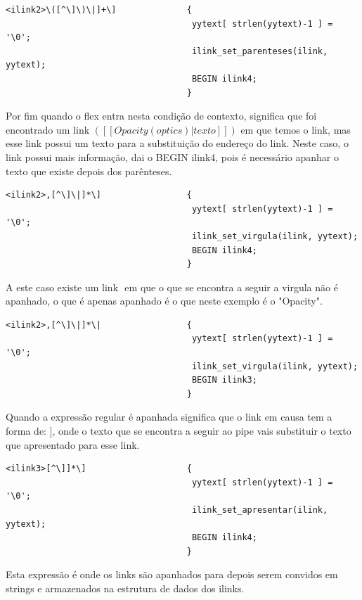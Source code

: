 \documentclass[11pt, a4paper, oneside]{article}
\begin{document}
\begin{verbatim}
<ilink2>\([^\]\)\|]+\]              {
                                     yytext[ strlen(yytext)-1 ] = '\0';
                                     ilink_set_parenteses(ilink, yytext);
                                     BEGIN ilink4;
                                    }
\end{verbatim}
Por fim quando o flex entra nesta condição de contexto, significa que foi encontrado um link \begin{math}([[Opacity (optics)|texto]])\end{math} em que temos o link, mas esse link possui um texto para a substituição do endereço do link.
Neste caso, o link possui mais informação, dai o BEGIN ilink4, pois é necessário apanhar o texto que existe depois dos parênteses.

\begin{verbatim}
<ilink2>,[^\]\|]*\]                 {
                                     yytext[ strlen(yytext)-1 ] = '\0';
                                     ilink_set_virgula(ilink, yytext);
                                     BEGIN ilink4;
                                    }
\end{verbatim}
A este caso existe um link \begin{math}[[Opacity, Não via ser apanhar]\end{math} em que o que se encontra a seguir a virgula não é apanhado, o que é apenas apanhado é o que neste exemplo é o "Opacity".

\begin{verbatim}
<ilink2>,[^\]\|]*\|                 {
                                     yytext[ strlen(yytext)-1 ] = '\0';
                                     ilink_set_virgula(ilink, yytext);
                                     BEGIN ilink3;
                                    }
\end{verbatim}
Quando a expressão regular é apanhada significa que o link em causa tem a forma de: \begin{math}[[Opacity, Não via ser apanhar| texto]]\end{math}, onde o texto que se encontra a seguir ao pipe vais substituir o texto que apresentado para esse link.

\begin{verbatim}
<ilink3>[^\]]*\]                    {
                                     yytext[ strlen(yytext)-1 ] = '\0';
                                     ilink_set_apresentar(ilink, yytext);
                                     BEGIN ilink4;
                                    }
\end{verbatim}
Esta expressão é onde os links são apanhados para depois serem convidos em strings e armazenados na estrutura de dados dos ilinks.
\end{document}
